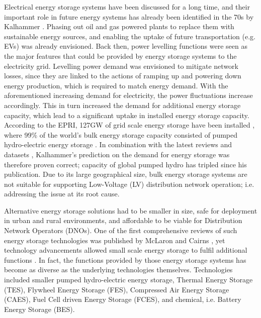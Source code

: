 Electrical energy storage systems have been discussed for a long time, and their important role in future energy systems has already been identified in the 70s by Kalhammer \cite{Kalhammer1979}.
Phasing out oil and gas powered plants to replace them with sustainable energy sources, and enabling the uptake of future transportation (e.g. EVs) was already envisioned.
Back then, power levelling functions were seen as the major features that could be provided by energy storage systems to the electricity grid.
Levelling power demand was envisioned to mitigate network losses, since they are linked to the actions of ramping up and powering down energy production, which is required to match energy demand.
With the aforementioned increasing demand for electricity, the power fluctuations increase accordingly.
This in turn increased the demand for additional energy storage capacity, which lead to a significant uptake in installed energy storage capacity.
According to the EPRI, 127GW of grid scale energy storage have been installed \cite{Rehman2015}, where 99\% of the world's bulk energy storage capacity consisted of pumped hydro-electric energy storage \cite{TheEconomist2012a}.
In combination with the latest reviews and datasets \cite{Barbour2016, Barbour2015}, Kalhammer's prediction on the demand for energy storage was therefore proven correct; capacity of global pumped hydro has tripled since his publication.
Due to its large geographical size, bulk energy storage systems are not suitable for supporting Low-Voltage (LV) distribution network operation; i.e. addressing the issue at its root cause.

Alternative energy storage solutions had to be smaller in size, safe for deployment in urban and rural environments, and affordable to be viable for Distribution Network Operators (DNOs).
One of the first comprehensive reviews of such energy storage technologies was published by McLaron and Cairns \cite{McLarnon1989}, yet technology advancements allowed small scale energy storage to fulfil additional functions \cite{Ibrahim2008, Chen2009, Hadjipaschalis2009, Luo2015}.
In fact, the functions provided by those energy storage systems has become as diverse as the underlying technologies themselves.
Technologies included smaller pumped hydro-electric energy storage, Thermal Energy Storage (TES), Flywheel Energy Storage (FES), Compressed Air Energy Storage (CAES), Fuel Cell driven Energy Storage (FCES), and chemical, i.e. Battery Energy Storage (BES).